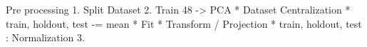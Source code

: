 Pre processing
1. Split Dataset
2. Train 48 -> PCA
    * Dataset Centralization
        * train, holdout, test -= mean
    * Fit
    * Transform / Projection
        * train, holdout, test : Normalization
3. 